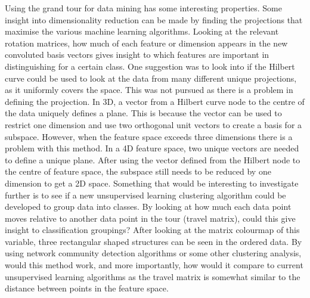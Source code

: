 \documentclass[a4paper,11pt,twoside]{article}
\begin{document}
Using the grand tour for data mining has some interesting properties. Some insight into dimensionality reduction can be made by finding the projections that maximise the various machine learning algorithms. Looking at the relevant rotation matrices, how much of each feature or dimension appears in the new convoluted basis vectors gives insight to which features are important in distinguishing for a certain class.
\newline
\newline
One suggestion was to look into if the Hilbert curve could be used to look at the data from many different unique projections, as it uniformly covers the space. This was not pursued as there is a problem in defining the projection. In 3D, a vector from a Hilbert curve node to the centre of the data uniquely defines a plane. This is because the vector can be used to restrict one dimension and use two orthogonal unit vectors to create a basis for a subspace. However, when the feature space exceeds three dimensions there is a problem with this method. In a 4D feature space, two unique vectors are needed to define a unique plane. After using the vector defined from the Hilbert node to the centre of feature space, the subspace still needs to be reduced by one dimension to get a 2D space. 
\newline
\newline
Something that would be interesting to investigate further is to see if a new unsupervised learning clustering algorithm could be developed to group data into classes. By looking at how much each data point moves relative to another data point in the tour (travel matrix), could this give insight to classification groupings? After looking at the matrix colourmap of this variable, three rectangular shaped structures can be seen in the ordered data. By using network community detection algorithms or some other clustering analysis, would this method work, and more importantly, how would it compare to current unsupervised learning algorithms as the travel matrix is somewhat similar to the distance between points in the feature space.


\end{document}
